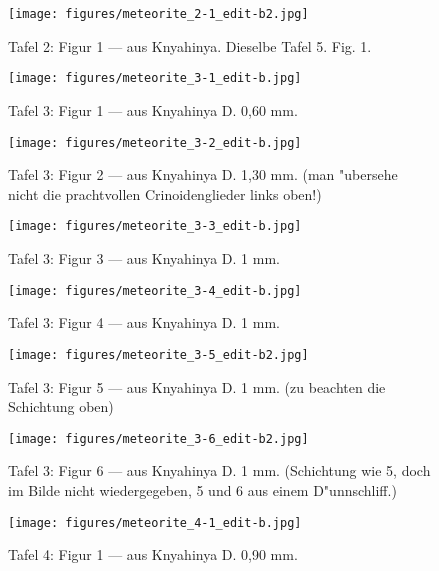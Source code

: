 \documentclass[a4paper, 11pt, oneside]{article}
\begin{document}
\clearpage
{}
\begin{figure}[t]
\texttt{[image: figures/meteorite\_2-1\_edit-b2.jpg]}
\caption{Tafel 2: Figur 1 --- aus Knyahinya. Dieselbe Tafel 5. Fig. 1.}
\centering
\end{figure}
\clearpage
{}
\begin{figure}[t]
\texttt{[image: figures/meteorite\_3-1\_edit-b.jpg]}
\caption{Tafel 3: Figur 1 --- aus Knyahinya D. 0,60 mm.}
\centering
\end{figure}
\clearpage
\begin{figure}[t]
\texttt{[image: figures/meteorite\_3-2\_edit-b.jpg]}
\caption{Tafel 3: Figur 2 --- aus Knyahinya D. 1,30 mm. (man "ubersehe nicht die prachtvollen Crinoidenglieder links oben!)}
\centering
\end{figure}
\clearpage
\begin{figure}[t]
\texttt{[image: figures/meteorite\_3-3\_edit-b.jpg]}
\caption{Tafel 3: Figur 3 --- aus Knyahinya D. 1 mm.}
\centering
\end{figure}
\clearpage
\begin{figure}[t]
\texttt{[image: figures/meteorite\_3-4\_edit-b.jpg]}
\caption{Tafel 3: Figur 4 --- aus Knyahinya D. 1 mm.}
\centering
\end{figure}
\clearpage
\begin{figure}[t]
\texttt{[image: figures/meteorite\_3-5\_edit-b2.jpg]}
\caption{Tafel 3: Figur 5 --- aus Knyahinya D. 1 mm. (zu beachten die Schichtung oben)}
\centering
\end{figure}
\clearpage
\begin{figure}[t]
\texttt{[image: figures/meteorite\_3-6\_edit-b2.jpg]}
\caption{Tafel 3: Figur 6 --- aus Knyahinya D. 1 mm. (Schichtung wie 5, doch im Bilde nicht wiedergegeben, 5 und 6 aus einem D"unnschliff.)}
\centering
\end{figure}
\clearpage
{}
\begin{figure}[t]
\texttt{[image: figures/meteorite\_4-1\_edit-b.jpg]}
\caption{Tafel 4: Figur 1 --- aus Knyahinya D. 0,90 mm.}
\centering
\end{figure}
\end{document}
